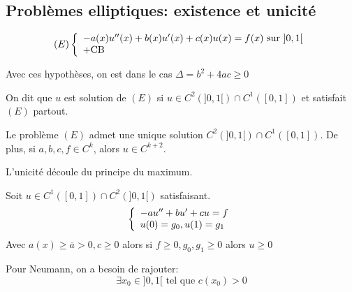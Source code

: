 \documentclass[]{report}
\begin{document}
    \subsection{Problèmes elliptiques: existence et unicité}

    \[(E) \left\{\begin{array}{ll} -a(x)u''(x)+b(x)u'(x)+c(x)u(x)=f(x)\text{ sur $]0,1[$}\\\text{+CB} \end{array} \right.\]

    \begin{re}{}{}
        Avec ces hypothèses, on est dans le cas $\Delta=b^2+4ac\ge 0$
    \end{re}

    \begin{df}{}{}
        On dit que $u$ est solution de $(E)$ si $u\in C^2(]0,1[)\cap C^1([0,1])$ et satisfait $(E)$ partout.
    \end{df}

    \begin{tm}{}{}
        Le problème $(E)$ admet une unique solution $C^2(]0,1[)\cap C^1([0,1])$. De plus, si $a,b,c,f\in C^k$, alors $u\in C^{k+2}$.
    \end{tm}

    L'unicité découle du principe du maximum.

    \begin{tm}{}{}
        Soit $u\in C^1([0,1])\cap C^2(]0,1[)$ satisfaisant.
        \[\left\{\begin{array}{ll} -au''+bu'+cu=f\\ u(0)=g_0,u(1)=g_1 \end{array} \right.\]
        Avec $a(x)\ge \overline{a}>0,c\ge 0$ alors si $f\ge 0, g_0,g_1\ge 0$ alors $u\ge 0$
    \end{tm}

    \begin{re}{}{}
        Pour Neumann, on a besoin de rajouter:
        \[\exists x_0\in ]0,1[\text{ tel que }c(x_0)>0\]
    \end{re}
\end{document}
